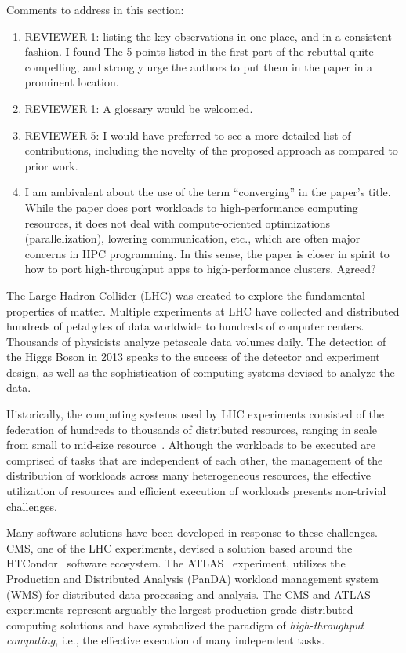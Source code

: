 \ifreview
Comments to address in this section:
\begin{enumerate}
	\item REVIEWER 1: listing the key observations in one place, and in a
	consistent fashion. I found The 5 points listed in the first part of the
	rebuttal quite compelling, and strongly urge the authors to put them in
	the paper in a prominent location.
	\item REVIEWER 1: A glossary would be welcomed.
	\item REVIEWER 5: I would have preferred to see a more detailed list of
	contributions, including the novelty of the proposed approach as compared
	to prior work.
	\item I am ambivalent about the use of the term ``converging'' in the
	paper's title. While the paper does port workloads to high-performance
	computing resources, it does not deal with compute-oriented optimizations
	(parallelization), lowering communication, etc., which are often major
	concerns in HPC programming. In this sense, the paper is closer in spirit
	to how to port high-throughput apps to high-performance clusters. Agreed?
\end{enumerate}
\fi



The Large Hadron Collider (LHC) was created to explore the fundamental
properties of matter. Multiple experiments at LHC have collected and
distributed hundreds of petabytes of data worldwide to hundreds of computer
centers. Thousands of physicists analyze petascale data volumes daily. The
detection of the Higgs Boson in 2013 speaks to the success of the detector
and experiment design, as well as the sophistication of computing systems
devised to analyze the data.

Historically, the computing systems used by LHC experiments consisted of the
federation of hundreds to thousands of distributed resources, %
ranging in scale from small to mid-size resource~\cite{foster2003grid}.
Although the workloads to be executed are comprised of tasks that are
independent of each other, the management of the distribution of workloads
across many heterogeneous resources, the effective utilization of resources
and efficient execution of workloads presents non-trivial challenges.

Many software solutions have been developed in response to these challenges.
CMS, one of the LHC experiments, devised a solution based around the
HTCondor~\cite{thain2005distributed} software ecosystem. The
ATLAS~\cite{Aad:2008} experiment, utilizes the Production and Distributed
Analysis (PanDA) workload management system~\cite{Maeno2011} (WMS) for
distributed data processing and analysis. The CMS and ATLAS experiments
represent arguably the largest production grade distributed computing
solutions and have symbolized the paradigm of {\it high-throughput
computing}, i.e., the effective execution of many independent tasks.

